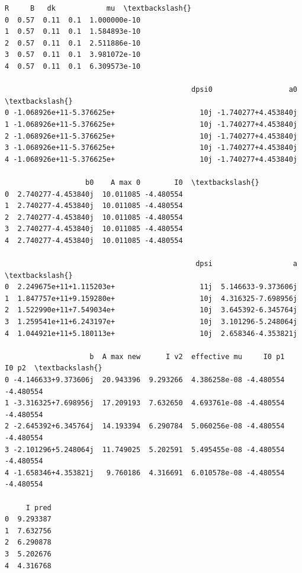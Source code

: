 \documentclass[11pt]{article}
\makeatletter
\newcommand{\boxspacing}{\kern\kvtcb@left@rule\kern\kvtcb@boxsep}
\newcommand{\prompt}[4]{
        {\ttfamily\llap{{\color{#2}[#3]:\hspace{3pt}#4}}\vspace{-\baselineskip}}
    }
\makeatother
\begin{document}
            \begin{tcolorbox}[breakable, size=fbox, boxrule=.5pt, pad at break*=1mm, opacityfill=0]
\prompt{Out}{outcolor}{41}{\boxspacing}
\begin{Verbatim}[commandchars=\\\{\}]
      R     B   dk            mu  \textbackslash{}
0  0.57  0.11  0.1  1.000000e-10
1  0.57  0.11  0.1  1.584893e-10
2  0.57  0.11  0.1  2.511886e-10
3  0.57  0.11  0.1  3.981072e-10
4  0.57  0.11  0.1  6.309573e-10

                                            dpsi0                  a0  \textbackslash{}
0 -1.068926e+11-5.376625e+                    10j -1.740277+4.453840j
1 -1.068926e+11-5.376625e+                    10j -1.740277+4.453840j
2 -1.068926e+11-5.376625e+                    10j -1.740277+4.453840j
3 -1.068926e+11-5.376625e+                    10j -1.740277+4.453840j
4 -1.068926e+11-5.376625e+                    10j -1.740277+4.453840j

                   b0    A max 0        I0  \textbackslash{}
0  2.740277-4.453840j  10.011085 -4.480554
1  2.740277-4.453840j  10.011085 -4.480554
2  2.740277-4.453840j  10.011085 -4.480554
3  2.740277-4.453840j  10.011085 -4.480554
4  2.740277-4.453840j  10.011085 -4.480554

                                             dpsi                   a  \textbackslash{}
0  2.249675e+11+1.115203e+                    11j  5.146633-9.373606j
1  1.847757e+11+9.159280e+                    10j  4.316325-7.698956j
2  1.522990e+11+7.549034e+                    10j  3.645392-6.345764j
3  1.259541e+11+6.243197e+                    10j  3.101296-5.248064j
4  1.044921e+11+5.180113e+                    10j  2.658346-4.353821j

                    b  A max new      I v2  effective mu     I0 p1     I0 p2  \textbackslash{}
0 -4.146633+9.373606j  20.943396  9.293266  4.386258e-08 -4.480554 -4.480554
1 -3.316325+7.698956j  17.209193  7.632650  4.693761e-08 -4.480554 -4.480554
2 -2.645392+6.345764j  14.193394  6.290784  5.060256e-08 -4.480554 -4.480554
3 -2.101296+5.248064j  11.749025  5.202591  5.495455e-08 -4.480554 -4.480554
4 -1.658346+4.353821j   9.760186  4.316691  6.010578e-08 -4.480554 -4.480554

     I pred
0  9.293387
1  7.632756
2  6.290878
3  5.202676
4  4.316768
\end{Verbatim}
\end{tcolorbox}
        
\end{document}
